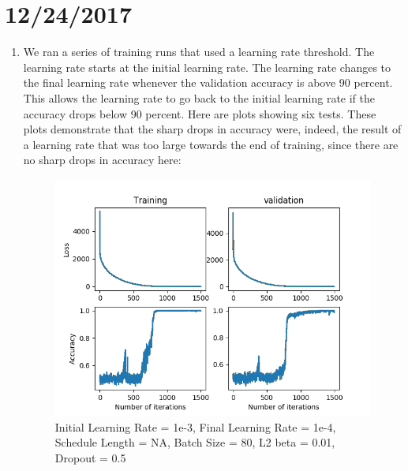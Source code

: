 \documentclass[12pt,reqno]{amsart}
\numberwithin{equation}{section}
\begin{document}
\section{12/24/2017}
\begin{enumerate}
\item We ran a series of training runs that used a learning rate threshold.  The learning rate starts at the initial learning rate.  The learning rate changes to the final learning rate whenever the validation accuracy is above 90 percent.  This allows the learning rate to go back to the initial learning rate if the accuracy drops below 90 percent.  Here are plots showing six tests.  These plots demonstrate that the sharp drops in accuracy were, indeed, the result of a learning rate that was too large towards the end of training, since there are no sharp drops in accuracy here:

\begin{figure}[H]
\centering
\includegraphics[scale=0.6]{threshold-test-1e-3-1e-4-1}
\caption{Initial Learning Rate = 1e-3, Final Learning Rate = 1e-4, Schedule Length = NA, Batch Size = 80, L2 beta = 0.01, Dropout = 0.5}
\end{figure}


\end{enumerate}
\end{document}
